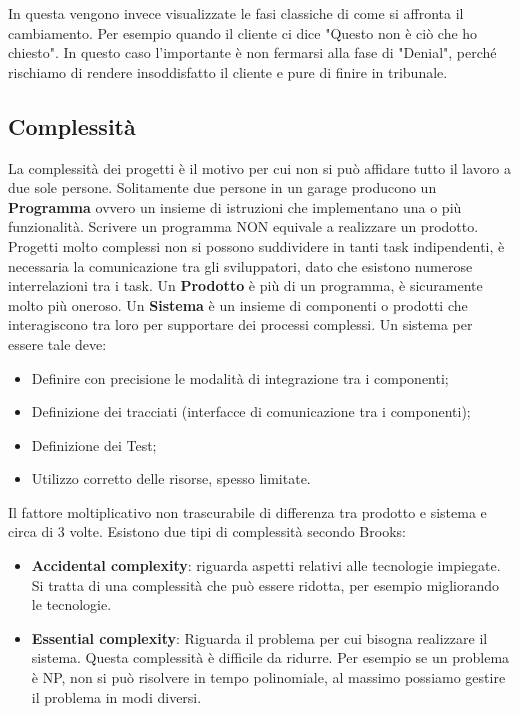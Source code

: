 \noindent In questa vengono invece visualizzate le fasi classiche di come si affronta il cambiamento. Per esempio quando il cliente ci dice "Questo non è ciò che ho chiesto".
\noindent In questo caso l'importante è non fermarsi alla fase di "Denial", perché rischiamo di rendere insoddisfatto il cliente e pure di finire in tribunale.
\subsection{Complessità}
La complessità dei progetti è il motivo per cui non si può affidare tutto il lavoro a due sole persone. Solitamente due persone in un garage producono un \textbf{Programma} ovvero un insieme di istruzioni che implementano una o più funzionalità. Scrivere un programma NON equivale a realizzare un prodotto. Progetti molto complessi non si possono suddividere in tanti task indipendenti, è necessaria la comunicazione tra gli sviluppatori, dato che esistono numerose interrelazioni tra i task.\newline
Un \textbf{Prodotto} è più di un programma, è sicuramente molto più oneroso.
Un \textbf{Sistema} è un insieme di componenti o prodotti che interagiscono tra loro per supportare dei processi complessi. Un sistema per essere tale deve:
\begin{itemize}
	\item Definire con precisione le modalità di integrazione tra i componenti;
	\item Definizione dei tracciati (interfacce di comunicazione tra i componenti);
	\item Definizione dei Test;
	\item Utilizzo corretto delle risorse, spesso limitate.
\end{itemize}
Il fattore moltiplicativo non trascurabile di differenza tra prodotto e sistema e circa di 3 volte.\newline
Esistono due tipi di complessità secondo Brooks:
\begin{itemize}
	\item \textbf{Accidental complexity}: riguarda aspetti relativi alle tecnologie impiegate. Si tratta di una complessità che può essere ridotta, per esempio migliorando le tecnologie.
	\item \textbf{Essential complexity}: Riguarda il problema per cui bisogna realizzare il sistema. Questa complessità è difficile da ridurre. Per esempio se un problema è NP, non si può risolvere in tempo polinomiale, al massimo possiamo gestire il problema in modi diversi.
\end{itemize}

